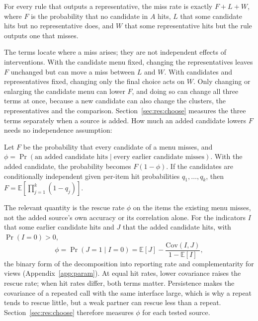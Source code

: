 \begin{proposition}\label{prop:three}
For every rule that outputs a representative, the miss rate is exactly $F+L+W$, where $F$ is the probability that no candidate in $A$ hits, $L$ that some candidate hits but no representative does, and $W$ that some representative hits but the rule outputs one that misses.
\end{proposition}

The terms locate where a miss arises; they are not independent effects of interventions. With the candidate menu fixed, changing the representatives leaves $F$ unchanged but can move a miss between $L$ and $W$. With candidates and representatives fixed, changing only the final choice acts on $W$. Only changing or enlarging the candidate menu can lower $F$, and doing so can change all three terms at once, because a new candidate can also change the clusters, the representatives and the comparison. Section~\ref{sec:res:choose} measures the three terms separately when a source is added. How much an added candidate lowers $F$ needs no independence assumption:

\begin{proposition}\label{prop:coverage}
Let $F$ be the probability that every candidate of a menu misses, and $\phi=\Pr(\text{an added candidate hits}\mid\text{every earlier candidate misses})$. With the added candidate, the probability becomes $F(1-\phi)$. If the candidates are conditionally independent given per-item hit probabilities $q_1,\dots,q_k$, then $F=\mathbb{E}[\prod_{j=1}^{k}(1-q_j)]$.
\end{proposition}

The relevant quantity is the rescue rate $\phi$ on the items the existing menu misses, not the added source's own accuracy or its correlation alone. For the indicators $I$ that some earlier candidate hits and $J$ that the added candidate hits, with $\Pr(I=0)>0$,
\[
\phi=\Pr(J=1\mid I=0)=\mathbb{E}[J]-\frac{\mathrm{Cov}(I,J)}{1-\mathbb{E}[I]},
\]
the binary form of the decomposition into reporting rate and complementarity for views (Appendix~\ref{app:param}). At equal hit rates, lower covariance raises the rescue rate; when hit rates differ, both terms matter. Persistence makes the covariance of a repeated call with the same interface large, which is why a repeat tends to rescue little, but a weak partner can rescue less than a repeat. Section~\ref{sec:res:choose} therefore measures $\phi$ for each tested source.

